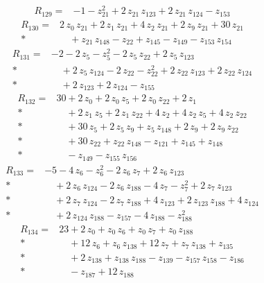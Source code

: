 \documentclass[10pt]{article}
\begin{document}
\begin{align*}
R_{129}={}& - 1 - z_{21}^{2} + 2\,z_{21}\,z_{123} + 2\,z_{21}\,z_{124} - z_{153}
\end{align*}
\begin{align*}
R_{130}={}& 2\,z_{0}\,z_{21} + 2\,z_{1}\,z_{21} + 4\,z_{2}\,z_{21} + 2\,z_{9}\,z_{21} + 30\,z_{21} \\*
&\quad + z_{21}\,z_{148} - z_{22} + z_{145} - z_{149} - z_{153}\,z_{154}
\end{align*}
\begin{align*}
R_{131}={}& - 2 - 2\,z_{5} - z_{5}^{2} - 2\,z_{5}\,z_{22} + 2\,z_{5}\,z_{123} \\*
&\quad + 2\,z_{5}\,z_{124} - 2\,z_{22} - z_{22}^{2} + 2\,z_{22}\,z_{123} + 2\,z_{22}\,z_{124} \\*
&\quad + 2\,z_{123} + 2\,z_{124} - z_{155}
\end{align*}
\begin{align*}
R_{132}={}& 30 + 2\,z_{0} + 2\,z_{0}\,z_{5} + 2\,z_{0}\,z_{22} + 2\,z_{1} \\*
&\quad + 2\,z_{1}\,z_{5} + 2\,z_{1}\,z_{22} + 4\,z_{2} + 4\,z_{2}\,z_{5} + 4\,z_{2}\,z_{22} \\*
&\quad + 30\,z_{5} + 2\,z_{5}\,z_{9} + z_{5}\,z_{148} + 2\,z_{9} + 2\,z_{9}\,z_{22} \\*
&\quad + 30\,z_{22} + z_{22}\,z_{148} - z_{121} + z_{145} + z_{148} \\*
&\quad - z_{149} - z_{155}\,z_{156}
\end{align*}
\begin{align*}
R_{133}={}& - 5 - 4\,z_{6} - z_{6}^{2} - 2\,z_{6}\,z_{7} + 2\,z_{6}\,z_{123} \\*
&\quad + 2\,z_{6}\,z_{124} - 2\,z_{6}\,z_{188} - 4\,z_{7} - z_{7}^{2} + 2\,z_{7}\,z_{123} \\*
&\quad + 2\,z_{7}\,z_{124} - 2\,z_{7}\,z_{188} + 4\,z_{123} + 2\,z_{123}\,z_{188} + 4\,z_{124} \\*
&\quad + 2\,z_{124}\,z_{188} - z_{157} - 4\,z_{188} - z_{188}^{2}
\end{align*}
\begin{align*}
R_{134}={}& 23 + 2\,z_{0} + z_{0}\,z_{6} + z_{0}\,z_{7} + z_{0}\,z_{188} \\*
&\quad + 12\,z_{6} + z_{6}\,z_{138} + 12\,z_{7} + z_{7}\,z_{138} + z_{135} \\*
&\quad + 2\,z_{138} + z_{138}\,z_{188} - z_{139} - z_{157}\,z_{158} - z_{186} \\*
&\quad - z_{187} + 12\,z_{188}
\end{align*}
\end{document}
